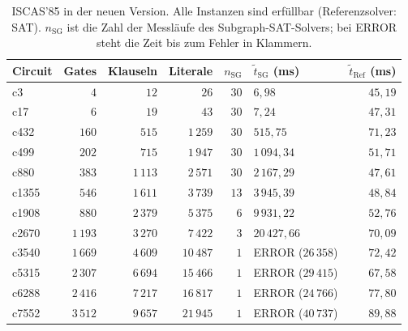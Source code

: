 \begin{table}[!ht]
	\centering
	\small
	\begin{tabularx}{\textwidth}{@{}lrrrrYr@{}}
		\toprule
		Circuit & Gates & Klauseln & Literale & $n_{\mathrm{SG}}$ & $\tilde t_{\mathrm{SG}}$ (ms) & $\tilde t_{\mathrm{Ref}}$ (ms) \\
		\midrule
		c3 & $4$ & $12$ & $26$ & $30$ & $6{,}98$ & $45{,}19$ \\
		c17 & $6$ & $19$ & $43$ & $30$ & $7{,}24$ & $47{,}31$ \\
		c432 & $160$ & $515$ & $1\,259$ & $30$ & $515{,}75$ & $71{,}23$ \\
		c499 & $202$ & $715$ & $1\,947$ & $30$ & $1\,094{,}34$ & $51{,}71$ \\
		c880 & $383$ & $1\,113$ & $2\,571$ & $30$ & $2\,167{,}29$ & $47{,}61$ \\
		c1355 & $546$ & $1\,611$ & $3\,739$ & $13$ & $3\,945{,}39$ & $48{,}84$ \\
		c1908 & $880$ & $2\,379$ & $5\,375$ & $6$ & $9\,931{,}22$ & $52{,}76$ \\
		c2670 & $1\,193$ & $3\,270$ & $7\,422$ & $3$ & $20\,427{,}66$ & $70{,}09$ \\
		c3540 & $1\,669$ & $4\,609$ & $10\,487$ & $1$ & ERROR ($26\,358$) & $72{,}42$ \\
		c5315 & $2\,307$ & $6\,694$ & $15\,466$ & $1$ & ERROR ($29\,415$) & $67{,}58$ \\
		c6288 & $2\,416$ & $7\,217$ & $16\,817$ & $1$ & ERROR ($24\,766$) & $77{,}80$ \\
		c7552 & $3\,512$ & $9\,657$ & $21\,945$ & $1$ & ERROR ($40\,737$) & $89{,}88$ \\
		\bottomrule
	\end{tabularx}
	\caption{ISCAS'85 in der neuen Version. Alle Instanzen sind erfüllbar (Referenzsolver: SAT). $n_{\mathrm{SG}}$ ist die Zahl der Messläufe des Subgraph-SAT-Solvers; bei ERROR steht die Zeit bis zum Fehler in Klammern.}
	\label{tab:exp_iscas}
\end{table}

